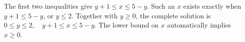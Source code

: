 The first two inequalities give $y+1\le x\le5-y$. Such an $x$ exists exactly when $y+1\le5-y$, or $y\le2$. Together with $y\ge0$, the complete solution is $\boxed{0\le y\le2,\quad y+1\le x\le5-y}$. The lower bound on $x$ automatically implies $x\ge0$.
